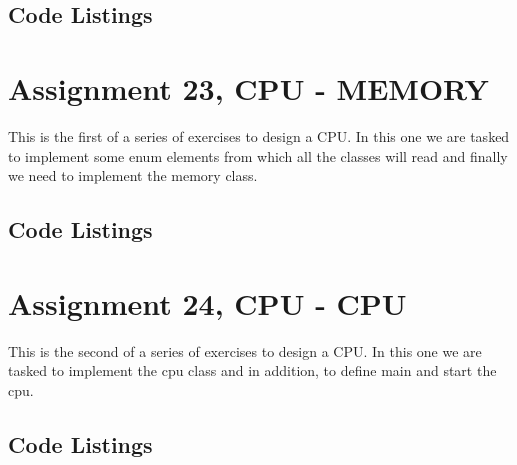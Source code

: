 \documentclass[11pt]{article}
\begin{document}
\subsection*{Code Listings}







\section*{Assignment 23, CPU - MEMORY}
This is the first of a series of exercises to design a CPU. In this one we are tasked to implement some enum elements from which all the classes will read and finally we need to implement the memory class.

\subsection*{Code Listings}








\section*{Assignment 24, CPU - CPU}
This is the second of a series of exercises to design a CPU. In this one we are tasked to implement the cpu class and in addition, to define main and start the cpu.

\subsection*{Code Listings}






\end{document}
